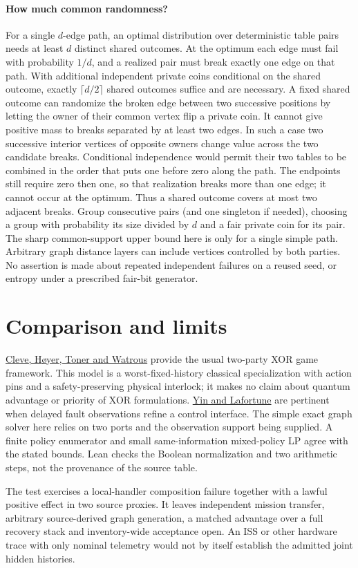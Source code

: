 \documentclass[11pt]{article}
\begin{document}
\paragraph{How much common randomness?}
For a single \(d\)-edge path, an optimal distribution over deterministic
table pairs needs at least \(d\) distinct shared outcomes. At the optimum
each edge must fail with probability \(1/d\), and a realized pair must
break exactly one edge on that path. With additional independent
private coins conditional on the shared outcome, exactly
\(\lceil d/2\rceil\) shared outcomes suffice and are necessary.
A fixed shared outcome can randomize the broken edge between two
successive positions by letting the owner of their common vertex flip
a private coin. It cannot give positive mass to breaks separated by
at least two edges. In such a case two successive interior vertices
of opposite owners change value across the two candidate breaks.
Conditional independence would permit their two tables to be combined
in the order that puts one before zero along the path. The endpoints
still require zero then one, so that realization breaks more than one
edge; it cannot occur at the optimum. Thus a shared outcome covers
at most two adjacent breaks. Group consecutive pairs (and one
singleton if needed), choosing a group with probability its size divided
by \(d\) and a fair private coin for its pair. The sharp common-support
upper bound here is only for a single simple path. Arbitrary graph
distance layers can include vertices controlled by both parties.
No assertion is made about repeated independent failures on a reused
seed, or entropy under a prescribed fair-bit generator.

\section{Comparison and limits}
\href{https://cs.uwaterloo.ca/~watrous/Papers/NonlocalGames.pdf}{Cleve,
H{\o}yer, Toner and Watrous} provide the usual two-party XOR game
framework. This model is a worst-fixed-history classical specialization
with action pins and a safety-preserving physical interlock; it makes
no claim about quantum advantage or priority of XOR formulations.
\href{https://www.sciencedirect.com/science/article/pii/S0005109815003490}{Yin
and Lafortune} are pertinent when delayed fault observations refine
a control interface. The simple exact graph solver here relies on two
ports and the observation support being supplied. A finite policy
enumerator and small same-information mixed-policy LP agree with
the stated bounds. Lean checks the Boolean normalization and two
arithmetic steps, not the provenance of the source table.

The test exercises a local-handler composition failure together with
a lawful positive effect in two source proxies. It leaves independent
mission transfer, arbitrary source-derived graph generation, a matched
advantage over a full recovery stack and inventory-wide acceptance
open. An ISS or other hardware trace with only nominal telemetry
would not by itself establish the admitted joint hidden histories.
\end{document}
